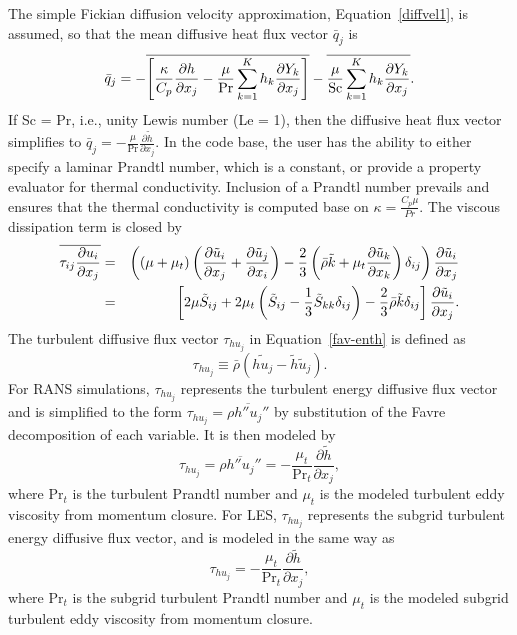 The simple Fickian diffusion velocity approximation, Equation~\ref{diffvel1},
is assumed, so that the mean diffusive heat flux vector $\bar{q}_j$ is
%
\begin{eqnarray}
  \bar{q}_j = - \overline{ \left[ {\kappa \over {C_p}}
                       {{\partial h} \over {\partial x_j}}
                 -  {\mu \over {\rm Pr}} 
        \sum_{k=1}^K h_k {{\partial Y_k} \over {\partial x_j}} \right] }
     - \overline{ {\mu \over {\rm Sc}}
        \sum_{k=1}^K h_k {{\partial Y_k} \over {\partial x_j}} }.
\end{eqnarray}
%
If Sc = Pr, i.e., unity Lewis number (Le = 1), then the diffusive heat
flux vector simplifies to $\bar{q}_j = -\frac{\mu}{\mathrm{Pr}}
\frac{\partial \tilde{h}}{\partial x_j}$.  In the code base, the user
has the ability to either specify a laminar Prandtl number, which is
a constant, or provide a property evaluator for thermal conductivity. Inclusion
of a Prandtl number prevails and ensures that the thermal conductivity is computed
base on $\kappa = \frac{C_p \mu}{Pr}$. The viscous dissipation term is closed by
%
\begin{eqnarray}
\overline{\tau_{ij} {{\partial u_i} \over {\partial x_j }}}
  &=& \left(\left(\mu + \mu_t\right) \left( {{\partial \tilde{u}_i} 
      \over {\partial x_j}}
    + {{\partial \tilde{u}_j} \over {\partial x_i}} \right)
    - {2 \over 3} \left( \bar{\rho} \tilde{k} + 
      \mu_t{{\partial \tilde{u}_k} \over {\partial x_k}} \right)
      \delta_{ij} \right) {{\partial \tilde{u}_i} \over {\partial x_j}}
      \nonumber \\
  &=& \left[ 2 \mu \tilde{S}_{ij} 
    + 2 \mu_t \left( \tilde{S}_{ij} - \frac{1}{3} \tilde{S}_{kk}
      \delta_{ij} \right) - \frac{2}{3} \bar{\rho} \tilde{k}
      \delta_{ij} \right] \frac{\partial \tilde{u}_i}{\partial x_j}.
\end{eqnarray}
%
The turbulent diffusive flux vector $\tau_{h u_j}$ in Equation~\ref{fav-enth}
is defined as
%
\begin{equation}
\tau_{h u_j} \equiv \bar{\rho} \left( \widetilde{h u_j} - 
     \tilde{h} \tilde{u}_j \right).
\end{equation}
%
For RANS simulations, $\tau_{h u_j}$ represents the turbulent energy 
diffusive flux vector and is simplified to the form 
$\tau_{h u_j} = \overline{\rho h'' u_j''}$ by substitution of the 
Favre decomposition of each variable.  It is then modeled by
%
\begin{equation}
\tau_{h u_j} = \overline{\rho h'' u_j''}
   = - \frac{\mu_t}{\mathrm{Pr}_t} \frac{\partial \tilde{h}}{\partial x_j},
\end{equation}
%
where $\mathrm{Pr}_t$ is the turbulent Prandtl number and $\mu_t$ is 
the modeled turbulent eddy viscosity from momentum closure.  For LES, 
$\tau_{h u_j}$ represents
the subgrid turbulent energy diffusive flux vector, and is modeled in the
same way as
%
\begin{equation}
\tau_{h u_j} = - \frac{\mu_t}{\mathrm{Pr}_t} \frac{\partial 
     \tilde{h}}{\partial x_j},
\end{equation}
%
where $\mathrm{Pr}_t$ is the subgrid turbulent Prandtl number and $\mu_t$
is the modeled subgrid turbulent eddy viscosity from momentum closure.


